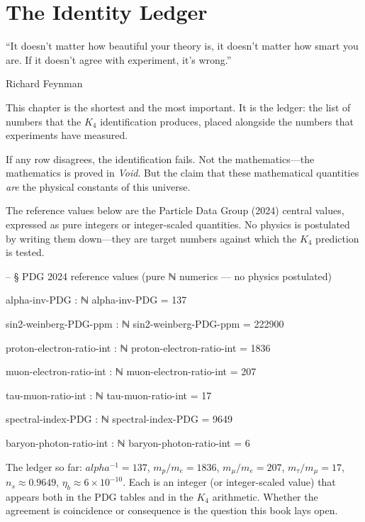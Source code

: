 \documentclass[11pt,a4paper]{book}
\def\alpha{alpha}%
\begin{document}
\chapter{The Identity Ledger}
\label{ch:identity-ledger}

\epigraph{``It doesn't matter how beautiful your theory is, it doesn't matter how smart you are. If it doesn't agree with experiment, it's wrong.''}{Richard Feynman}

This chapter is the shortest and the most important. It is the ledger: the list of numbers that the $K_4$ identification produces, placed alongside the numbers that experiments have measured.

If any row disagrees, the identification fails. Not the mathematics---the mathematics is proved in \textit{Void}. But the claim that these mathematical quantities \emph{are} the physical constants of this universe.

The reference values below are the Particle Data Group (2024) central values, expressed as pure integers or integer-scaled quantities. No physics is postulated by writing them down---they are target numbers against which the $K_4$ prediction is tested.

\begin{code}
-- § PDG 2024 reference values   (pure ℕ numerics — no physics postulated)

alpha-inv-PDG : ℕ
alpha-inv-PDG = 137

sin2-weinberg-PDG-ppm : ℕ
sin2-weinberg-PDG-ppm = 222900

proton-electron-ratio-int : ℕ
proton-electron-ratio-int = 1836

muon-electron-ratio-int : ℕ
muon-electron-ratio-int = 207

tau-muon-ratio-int : ℕ
tau-muon-ratio-int = 17

spectral-index-PDG : ℕ
spectral-index-PDG = 9649

baryon-photon-ratio-int : ℕ
baryon-photon-ratio-int = 6
\end{code}

The ledger so far: $\alpha^{-1} = 137$, $m_p/m_e = 1836$, $m_\mu/m_e = 207$, $m_\tau/m_\mu = 17$, $n_s \approx 0.9649$, $\eta_b \approx 6 \times 10^{-10}$. Each is an integer (or integer-scaled value) that appears both in the PDG tables and in the $K_4$ arithmetic. Whether the agreement is coincidence or consequence is the question this book lays open.
\end{document}
